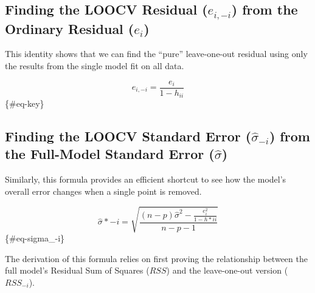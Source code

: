 \documentclass[
]{article}
\begin{document}
\subsection{\texorpdfstring{Finding the LOOCV Residual (\(e_{i,-i}\))
from the Ordinary Residual
(\(e_i\))}{Finding the LOOCV Residual (e\_\{i,-i\}) from the Ordinary Residual (e\_i)}}\label{finding-the-loocv-residual-e_i-i-from-the-ordinary-residual-e_i}

This identity shows that we can find the ``pure'' leave-one-out residual
using only the results from the single model fit on all data.

\[e_{i,-i} = \frac{e_i}{1 - h_{ii}}\] \{\#eq-key\}

\subsection{\texorpdfstring{Finding the LOOCV Standard Error
(\(\hat{\sigma}_{-i}\)) from the Full-Model Standard Error
(\(\hat{\sigma}\))}{Finding the LOOCV Standard Error (\textbackslash hat\{\textbackslash sigma\}\_\{-i\}) from the Full-Model Standard Error (\textbackslash hat\{\textbackslash sigma\})}}\label{finding-the-loocv-standard-error-hatsigma_-i-from-the-full-model-standard-error-hatsigma}

Similarly, this formula provides an efficient shortcut to see how the
model's overall error changes when a single point is removed.

\[\hat{\sigma}*{-i} = \sqrt{\frac{(n-p)\hat{\sigma}^2 - \frac{e_i^2}{1-h*{ii}}}{n-p-1}}\]
\{\#eq-sigma\_-i\}

The derivation of this formula relies on first proving the relationship
between the full model's Residual Sum of Squares (\(RSS\)) and the
leave-one-out version (\(RSS_{-i}\)).
\end{document}
